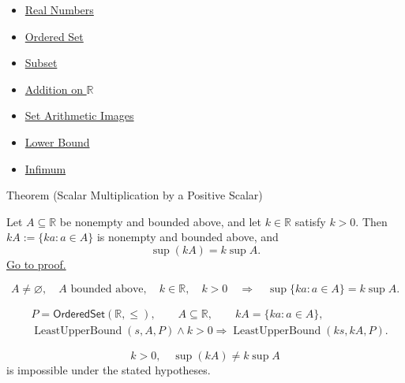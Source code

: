 \begin{dependencies}
\begin{itemize}
  \item \hyperref[def:reals]{Real Numbers}
  \item \hyperref[def:ordered-set]{Ordered Set}
  \item \hyperref[def:subset]{Subset}
  \item \hyperref[def:addition-on-r]{Addition on $\mathbb{R}$}
  \item \hyperref[def:set-arithmetic-images]{Set Arithmetic Images}
  \item \hyperref[def:real-lower-bound]{Lower Bound}
  \item \hyperref[def:infimum]{Infimum}
\end{itemize}
\end{dependencies}



\begin{theorembox}{Theorem (Scalar Multiplication by a Positive Scalar)}
\begin{theorem}
\label{thm:scalar-mult-positive}
Let $A\subseteq\mathbb{R}$ be nonempty and bounded above, and let
$k\in\mathbb{R}$ satisfy $k>0$.  Then $kA:=\{ka:a\in A\}$ is nonempty and
bounded above, and
\[
  \sup(kA)=k\sup A.
\]
\hyperref[prf:scalar-mult-positive]{Go to proof.}
\end{theorem}
\end{theorembox}

\begin{remark*}
\[
A\neq\varnothing,\quad A\text{ bounded above},\quad k\in\mathbb{R},\quad k>0
\quad\Longrightarrow\quad
\sup\{ka:a\in A\}=k\sup A.
\]
\end{remark*}

\begin{remark*}
\[
\begin{aligned}
&P=\mathsf{OrderedSet}(\mathbb{R},\leq),\qquad A\subseteq\mathbb{R},\qquad kA=\{ka:a\in A\},\\
&\operatorname{LeastUpperBound}(s,A,P)\land k>0
\Longrightarrow
\operatorname{LeastUpperBound}(ks,kA,P).
\end{aligned}
\]
\end{remark*}

\begin{remark*}
\[
k>0,\quad \sup(kA)\ne k\sup A
\]
is impossible under the stated hypotheses.
\end{remark*}

